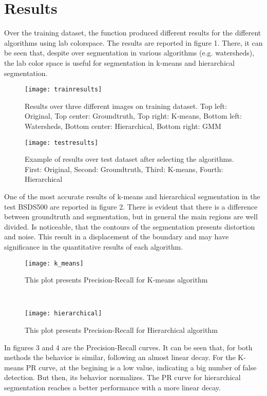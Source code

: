 \documentclass[10pt,twocolumn,letterpaper]{article}
\begin{document}
\section{Results}
Over the training dataset, the function produced different results for the different algorithms using lab colorspace. The results are reported in figure 1. There, it can be seen that, despite over segmentation in various algorithms (e.g. watersheds), the lab color space is useful for segmentation in k-means and hierarchical segmentation.
\begin{figure}[h]
\centering
\texttt{[image: trainresults]}
\caption{Results over three different images on training dataset. Top left: Original, Top center: Groundtruth, Top right: K-means, Bottom left: Watersheds, Bottom center: Hierarchical, Bottom right: GMM}
\centering
\end{figure}
\begin{figure}[h]
\centering
\texttt{[image: testresults]}
\caption{Example of results over test dataset after selecting the algorithms. First: Original, Second: Groundtruth, Third: K-means, Fourth: Hierarchical}
\centering
\end{figure}
One of the most accurate results of k-means and hierarchical segmentation in the test BSDS500 are reported in figure 2. There is evident that there is a difference between groundtruth and  segmentation, but in general the main regions are well divided. Is noticeable, that the contours of the segmentation presents distortion and noise. This result in a displacement of the boundary and may have significance in the quantitative results of each algorithm.
\begin{figure}[h]
\centering
\texttt{[image: k\_means]}
\caption{This plot presents Precision-Recall for K-means algorithm}
\centering
\end{figure}\\
\begin{figure}[h]
\centering
\texttt{[image: hierarchical]}
\caption{This plot presents Precision-Recall for Hierarchical algorithm}
\centering
\end{figure}
In figures 3 and 4 are the Precision-Recall curves. It can be seen that, for both methods the behavior is similar, following an almost linear decay. For the K-means PR curve, at the begining is a low value, indicating a big number of false detection. But then, its behavior normalizes. The PR curve for hierarchical segmentation reaches a better performance with a more linear decay.
\end{document}

